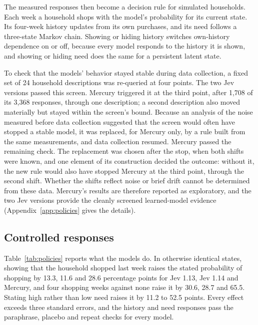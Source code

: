 \documentclass[11pt]{article}
\begin{document}
The measured responses then become a decision rule for simulated households. Each week a
household shops with the model's probability for its current state. Its four-week history
updates from its own purchases, and its need follows a three-state Markov chain. Showing or
hiding history switches own-history dependence on or off, because every model responds to the
history it is shown, and showing or hiding need does the same for a persistent latent state.

To check that the models' behavior stayed stable during data collection, a fixed set of 24
household descriptions was re-queried at four points. The two Jev versions passed this screen.
Mercury triggered it at the third point, after 1,708 of its 3,368 responses, through one
description; a second description also moved materially but stayed within the screen's bound.
Because an analysis of the noise measured before data collection suggested that the screen
would often have stopped a stable model, it was replaced, for Mercury only, by a rule built from
the same measurements, and data collection resumed. Mercury passed the remaining check. The
replacement was chosen after the stop, when both shifts were known, and one element of its
construction decided the outcome: without it, the new rule would also have stopped Mercury at
the third point, through the second shift. Whether the shifts reflect noise or brief drift
cannot be determined from these data. Mercury's results are therefore reported as exploratory,
and the two Jev versions provide the cleanly screened learned-model evidence
(Appendix~\ref{app:policies} gives the details).

\subsection{Controlled responses}

Table~\ref{tab:policies} reports what the models do. In otherwise identical states, showing
that the household shopped last week raises the stated probability of shopping by 13.3, 11.6
and 28.6 percentage points for Jev 1.13, Jev 1.14 and Mercury, and four shopping weeks
against none raise it by 30.6, 28.7 and 65.5. Stating high rather than low need raises it by 11.2 to
52.5 points. Every effect exceeds three standard errors, and the history and need responses
pass the paraphrase, placebo and repeat checks for every model.
\end{document}
